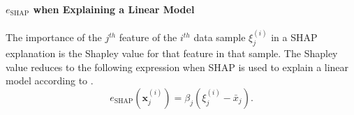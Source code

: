 \documentclass[mnsc,blindrev]{informs3}
\begin{document}
    


         \paragraph{$e_{\text{SHAP}}$ when Explaining a Linear Model}
              The importance of the $j^{th}$ feature of the $i^{th}$ data sample $\xi^{(i)}_j$ in a SHAP explanation is the Shapley value for that feature in that sample. The Shapley value reduces to the following expression when SHAP is used to explain a linear model according to \cite{StrumbeljErik2014Epma,lundberg17shap}. 
             \begin{equation}
                \label{eqn:shap_gt}
                e_\text{SHAP}(\mathbf{x}^{(i)}_j) = \beta_j (\xi^{(i)}_j - \bar{x}_j).
             \end{equation}
\end{document}
